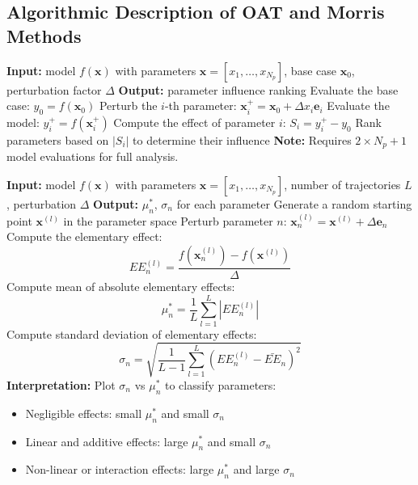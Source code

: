 \subsection*{Algorithmic Description of OAT and Morris Methods}

\begin{algorithm}[H]
\caption{One-at-a-Time (OAT) Sensitivity Analysis}
\begin{algorithmic}[1]
\State \textbf{Input:} model $f(\mathbf{x})$ with parameters $\mathbf{x} = [x_1, \dots, x_{N_p}]$, base case $\mathbf{x}_0$, perturbation factor $\Delta$
\State \textbf{Output:} parameter influence ranking
\State Evaluate the base case: $y_0 = f(\mathbf{x}_0)$
    \State Perturb the $i$-th parameter: $\mathbf{x}_i^+ = \mathbf{x}_0 + \Delta x_i \mathbf{e}_i$
    \State Evaluate the model: $y_i^+ = f(\mathbf{x}_i^+)$
    \State Compute the effect of parameter $i$: $S_i = y_i^+ - y_0$
\EndFor
\State Rank parameters based on $|S_i|$ to determine their influence
\State \textbf{Note:} Requires $2 \times N_p + 1$ model evaluations for full analysis.
\end{algorithmic}
\end{algorithm}

\begin{algorithm}[H]
\caption{Morris Method (Elementary Effects Method)}
\begin{algorithmic}[1]
\State \textbf{Input:} model $f(\mathbf{x})$ with parameters $\mathbf{x} = [x_1, \dots, x_{N_p}]$, number of trajectories $L$, perturbation $\Delta$
\State \textbf{Output:} $\mu_n^*$, $\sigma_n$ for each parameter
    \State Generate a random starting point $\mathbf{x}^{(l)}$ in the parameter space
        \State Perturb parameter $n$: $\mathbf{x}^{(l)}_n = \mathbf{x}^{(l)} + \Delta \mathbf{e}_n$
        \State Compute the elementary effect: 
        \[
        EE_n^{(l)} = \frac{f(\mathbf{x}^{(l)}_n) - f(\mathbf{x}^{(l)})}{\Delta}
        \]
    \EndFor
\EndFor
{}
    \State Compute mean of absolute elementary effects:
    \[
    \mu_n^* = \frac{1}{L} \sum_{l=1}^{L} |EE_n^{(l)}|
    \]
    \State Compute standard deviation of elementary effects:
    \[
    \sigma_n = \sqrt{\frac{1}{L-1} \sum_{l=1}^{L} (EE_n^{(l)} - \bar{EE}_n)^2}
    \]
\EndFor
\State \textbf{Interpretation:} Plot $\sigma_n$ vs $\mu_n^*$ to classify parameters:
\begin{itemize}
    \item Negligible effects: small $\mu_n^*$ and small $\sigma_n$
    \item Linear and additive effects: large $\mu_n^*$ and small $\sigma_n$
    \item Non-linear or interaction effects: large $\mu_n^*$ and large $\sigma_n$
\end{itemize}
\end{algorithmic}
\end{algorithm}

